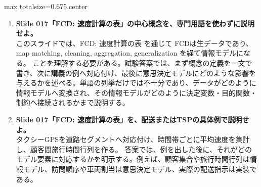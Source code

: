 \begin{adjustbox}{max totalsize={\textwidth}{0.675\textheight},center}
\begin{minipage}{\textwidth}
\begin{minipage}[t]{0.485\textwidth}
\begin{enumerate}
\item \textbf{Slide 017「FCD: 速度計算の表」の中心概念を、専門用語を使わずに説明せよ。}\\このスライドでは、FCD: 速度計算の表 を通じて FCDは生データであり、map matching, cleaning, aggregation, generalization を経て情報モデルになる。 ことを理解する必要がある。試験答案では、まず概念の定義を一文で書き、次に講義の例へ対応付け、最後に意思決定モデルにどのような影響を与えるかを述べる。単語の列挙だけでは不十分であり、データがどのように情報モデルへ変換され、その情報モデルがどのように決定変数・目的関数・制約へ接続されるかまで説明する。
\item \textbf{Slide 017「FCD: 速度計算の表」を、配送またはTSPの具体例で説明せよ。}\\タクシーGPSを道路セグメントへ対応付け、時間帯ごとに平均速度を集計し、顧客間旅行時間行列を作る。 答案では、例を出した後に、それがどのモデル要素に対応するかを明示する。例えば、顧客集合や旅行時間行列は情報モデル、訪問順序や車両割当は意思決定モデル、実際の配送指示は実装である。
\end{enumerate}
\end{minipage}
\end{minipage}
\end{adjustbox}

